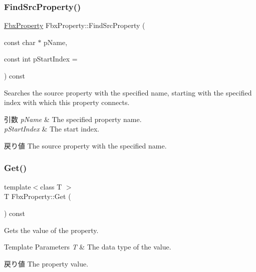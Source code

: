 \subsubsection{\texorpdfstring{Find\+Src\+Property()}{FindSrcProperty()}}
{\footnotesize\ttfamily \hyperlink{class_fbx_property}{Fbx\+Property} Fbx\+Property\+::\+Find\+Src\+Property (\begin{DoxyParamCaption}\item[{const char $\ast$}]{p\+Name,  }\item[{const int}]{p\+Start\+Index = {} }\end{DoxyParamCaption}) const}

Searches the source property with the specified name, starting with the specified index with which this property connects. 
\begin{DoxyParams}{引数}
{\em p\+Name} & The specified property name. \\
\hline
{\em p\+Start\+Index} & The start index. \\
\hline
\end{DoxyParams}
\begin{DoxyReturn}{戻り値}
The source property with the specified name. 
\end{DoxyReturn}
\mbox{\label{class_fbx_property_a7d3760c0aec45b51823c57f62a08dc46}} 
\subsubsection{\texorpdfstring{Get()}{Get()}\hspace{0.1cm}{\footnotesize\ttfamily [1/2]}}
{\footnotesize\ttfamily template$<$class T $>$ \\
T Fbx\+Property\+::\+Get (\begin{DoxyParamCaption}{ }\end{DoxyParamCaption}) const\hspace{0.3cm}{\ttfamily [inline]}}

Gets the value of the property. 
\begin{DoxyTemplParams}{Template Parameters}
{\em T} & The data type of the value. \\
\hline
\end{DoxyTemplParams}
\begin{DoxyReturn}{戻り値}
The property value. 
\end{DoxyReturn}


